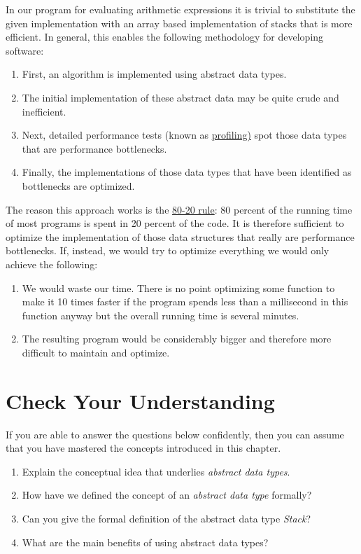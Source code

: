 \begin{enumerate}
       In our program for evaluating  arithmetic expressions it is trivial to substitute the given
       implementation with an array based implementation of stacks that is more efficient.  In general,
       this enables the following methodology for developing software:  
       \begin{enumerate}
       \item First, an algorithm is implemented using abstract data types.
       \item The initial implementation of these abstract data may be quite crude and inefficient.
       \item Next, detailed performance tests (known as 
             \href{http://en.wikipedia.org/wiki/Profiling_(computer_programming)}{profiling)}
             spot those data types that are performance bottlenecks.
       \item Finally, the implementations of those data types that have been identified as bottlenecks are optimized.
       \end{enumerate}
       The reason this approach works is the 
       \href{http://en.wikipedia.org/wiki/Pareto_principle#In_software}{80-20 rule}:  
       80 percent of the running time of most programs is spent in 20 percent of the code.  It is
       therefore sufficient to optimize the 
       implementation of those data structures that really are performance bottlenecks.  If,
       instead, we would try to optimize everything we would only achieve the following:
       \begin{enumerate}
       \item We would waste our time.  There is no point optimizing some function to make it 10 times
             faster if the program spends less than a millisecond in this function anyway but the
             overall running time is several minutes.
       \item The resulting program would be considerably bigger and therefore more difficult to 
             maintain and optimize.
       \end{enumerate}
 \end{enumerate}

\section{Check Your Understanding}
If you are able to answer the questions below confidently, then you can assume that you have mastered the concepts
introduced in this chapter.
\begin{enumerate}
\item Explain the conceptual idea that underlies \emph{abstract data types}.
\item How have we defined the concept of an \emph{abstract data type} formally?
\item Can you give the formal definition of the abstract data type \textsl{Stack}?
\item What are the main benefits of using abstract data types?
\end{enumerate}



